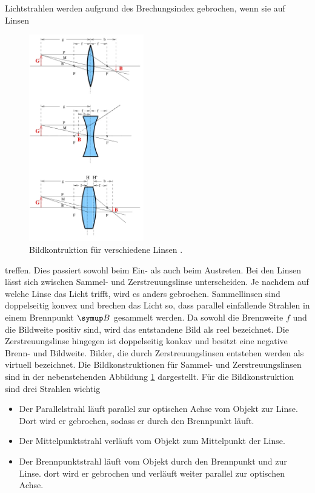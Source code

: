 Lichtstrahlen werden aufgrund des Brechungsindex gebrochen, wenn sie auf Linsen
\begin{figure}
  \includegraphics[width=5cm]{bilder/konstruktion.jpg}
  \caption{Bildkontruktion für verschiedene Linsen \cite{408}.}
  \label{fig:kons}
\end{figure}
treffen. Dies passiert sowohl beim Ein- als auch beim Austreten. Bei den Linsen
lässt sich zwischen Sammel- und Zerstreuungslinse unterscheiden. Je nachdem auf
welche Linse das Licht trifft, wird es anders gebrochen.
Sammellinsen sind doppelseitig konvex und brechen das Licht so, dass parallel
einfallende Strahlen in einem Brennpunkt $\su{B}$ gesammelt werden. Da sowohl die
Brennweite $f$ und die Bildweite positiv sind, wird das entstandene Bild als
reel bezeichnet. Die Zerstreuungslinse hingegen ist doppelseitig konkav und
besitzt eine negative Brenn- und Bildweite. Bilder, die durch Zerstreuungslinsen
entstehen werden als virtuell bezeichnet. Die Bildkonstruktionen für Sammel- und
Zerstreuungslinsen sind in der nebenstehenden Abbildung \ref{fig:kons} dargestellt.
Für die Bildkonstruktion sind drei Strahlen wichtig
\begin{itemize}
  \item Der Parallelstrahl läuft parallel zur optischen Achse vom Objekt zur Linse. Dort wird er gebrochen, sodass er durch den Brennpunkt läuft.
  \item Der Mittelpunktstrahl verläuft vom Objekt zum Mittelpunkt der Linse.
  \item Der Brennpunktstrahl läuft vom Objekt durch den Brennpunkt und zur Linse.
  dort wird er gebrochen und verläuft weiter parallel zur optischen Achse.
\end{itemize}
